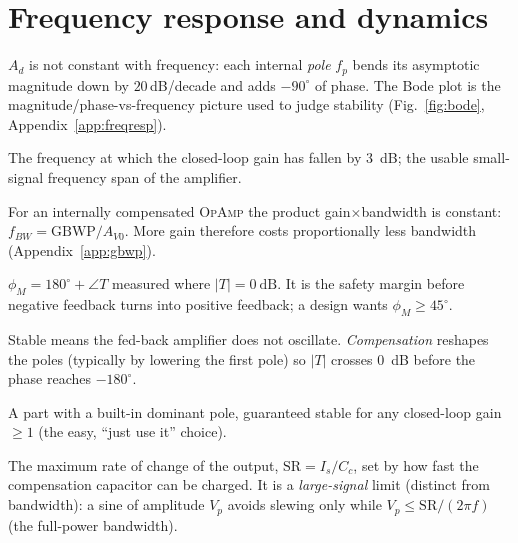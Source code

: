 \documentclass[11pt,a4paper,oneside]{book}
\newcommand{\Ad}{A_d}
\newcommand{\op}{\textsc{OpAmp}}
\begin{document}
\section{Frequency response and dynamics}
\begin{description}[style=unboxed,leftmargin=0pt,itemsep=5pt,parsep=0pt,
        font=\normalfont\bfseries\color{accent!85!black}]
\item[Pole / Bode plot.] $\Ad$ is not constant with frequency: each internal
  \emph{pole} $f_{p}$ bends its asymptotic magnitude down by $20$\,dB/decade and adds
  $-90^\circ$ of phase. The Bode plot is the magnitude/phase-vs-frequency picture used
  to judge stability (Fig.~\ref{fig:bode}, Appendix~\ref{app:freqresp}).
\item[Bandwidth $f_{BW}$.] The frequency at which the closed-loop gain has fallen by
  \qty{3}{\dB}; the usable small-signal frequency span of the amplifier.
\item[Gain--Bandwidth Product (GBWP, $f_T$).] For an internally compensated \op{} the
  product gain$\times$bandwidth is constant: $f_{BW}=\text{GBWP}/A_{V0}$. More gain
  therefore costs proportionally less bandwidth (Appendix~\ref{app:gbwp}).
\item[Phase margin $\phi_M$.] $\phi_M=180^\circ+\angle T$ measured where
  $|T|=\qty{0}{\dB}$. It is the safety margin before negative feedback turns into
  positive feedback; a design wants $\phi_M\ge45^\circ$.
\item[Stability / compensation.] Stable means the fed-back amplifier does not
  oscillate. \emph{Compensation} reshapes the poles (typically by lowering the first
  pole) so $|T|$ crosses \qty{0}{\dB} before the phase reaches $-180^\circ$.
\item[Internally compensated \op.] A part with a built-in dominant pole, guaranteed
  stable for any closed-loop gain $\ge1$ (the easy, ``just use it'' choice).
\item[Slew rate (SR).] The maximum rate of change of the output,
  $\text{SR}=I_s/C_c$, set by how fast the compensation capacitor can be charged. It
  is a \emph{large-signal} limit (distinct from bandwidth): a sine of amplitude $V_p$
  avoids slewing only while $V_p\le\text{SR}/(2\pi f)$ (the full-power bandwidth).
\end{description}
\end{document}
